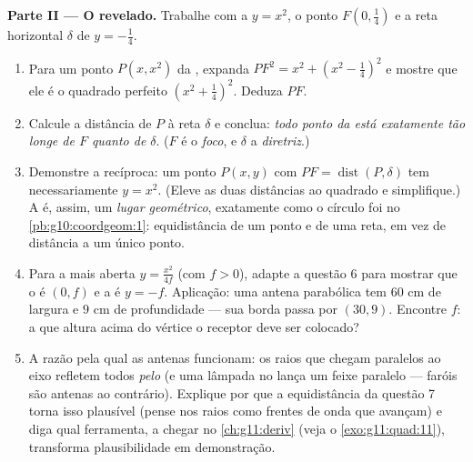 \begin{problem}
\medskip
\noindent\textbf{Parte II --- O  revelado.}
Trabalhe com a  $y = x^2$, o ponto
$F\left(0, \frac14\right)$ e a reta horizontal $\delta$ de 
$y = -\frac14$.
\begin{enumerate}[resume]
  \item Para um ponto $P(x, x^2)$ da , expanda
        $PF^2 = x^2 + \left(x^2 - \frac14\right)^2$ e mostre que
        ele é o quadrado perfeito
        $\left(x^2 + \frac14\right)^2$. Deduza $PF$.
  \item Calcule a distância de $P$ à reta $\delta$ e conclua:
        \emph{todo ponto da  está exatamente tão longe de
        $F$ quanto de $\delta$}. ($F$ é o
        \emph{foco}, e $\delta$ a
        \emph{diretriz}.)
  \item Demonstre a recíproca: um ponto $P(x, y)$ com
        $PF = \operatorname{dist}(P, \delta)$ tem
        necessariamente $y = x^2$. (Eleve as duas distâncias ao
        quadrado e simplifique.) A  é, assim, um
        \emph{lugar geométrico}, exatamente como o círculo foi no
        \cref{pb:g10:coordgeom:1}: equidistância de um ponto e de
        uma reta, em vez de distância a um único ponto.
  \item Para a  mais aberta $y = \frac{x^2}{4f}$ (com
        $f > 0$), adapte a questão 6 para mostrar que o  é
        $(0, f)$ e a  é $y = -f$. Aplicação: uma antena
        parabólica tem $60$ cm de largura e $9$ cm de
        profundidade --- sua borda passa por $(30, 9)$. Encontre
        $f$: a que altura acima do vértice o receptor deve ser
        colocado?
  \item A razão pela qual as antenas funcionam: os raios que
        chegam paralelos ao eixo refletem todos \emph{pelo }
        (e uma lâmpada no  lança um feixe paralelo --- faróis
        são antenas ao contrário). Explique por que a
        equidistância da questão 7 torna isso plausível (pense
        nos raios como frentes de onda que avançam) e diga qual
        ferramenta, a chegar no \cref{ch:g11:deriv} (veja o
        \cref{exo:g11:quad:11}), transforma plausibilidade em
        demonstração.
\end{enumerate}


\end{problem}
